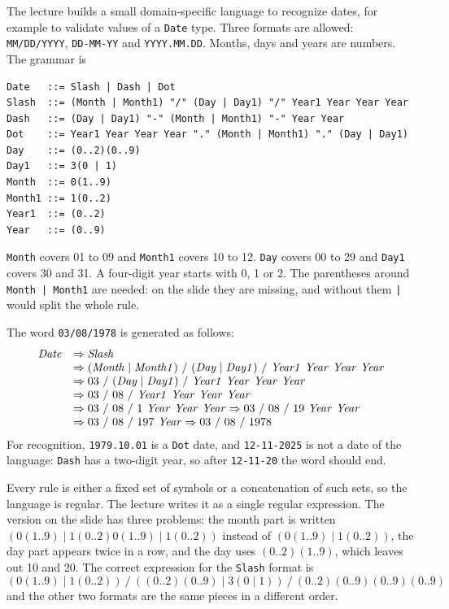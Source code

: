 The lecture builds a small domain-specific language to recognize dates, for
example to validate values of a \texttt{Date} type. Three formats are allowed:
\texttt{MM/DD/YYYY}, \texttt{DD-MM-YY} and \texttt{YYYY.MM.DD}. Months, days and
years are numbers. The grammar is
\begin{lstlisting}
Date   ::= Slash | Dash | Dot
Slash  ::= (Month | Month1) "/" (Day | Day1) "/" Year1 Year Year Year
Dash   ::= (Day | Day1) "-" (Month | Month1) "-" Year Year
Dot    ::= Year1 Year Year Year "." (Month | Month1) "." (Day | Day1)
Day    ::= (0..2)(0..9)
Day1   ::= 3(0 | 1)
Month  ::= 0(1..9)
Month1 ::= 1(0..2)
Year1  ::= (0..2)
Year   ::= (0..9)
\end{lstlisting}
\texttt{Month} covers 01 to 09 and \texttt{Month1} covers 10 to 12. \texttt{Day}
covers 00 to 29 and \texttt{Day1} covers 30 and 31. A four-digit year starts
with 0, 1 or 2. The parentheses around \texttt{Month | Month1} are needed: on the
slide they are missing, and without them \texttt{|} would split the whole rule.

The word \texttt{03/08/1978} is generated as follows:
\[
\begin{array}{l l}
\mathit{Date} & \Rightarrow \mathit{Slash} \\
& \Rightarrow (\mathit{Month} \mid \mathit{Month1})\ /\ (\mathit{Day} \mid \mathit{Day1})\ /\ \mathit{Year1}\ \mathit{Year}\ \mathit{Year}\ \mathit{Year} \\
& \Rightarrow 03\ /\ (\mathit{Day} \mid \mathit{Day1})\ /\ \mathit{Year1}\ \mathit{Year}\ \mathit{Year}\ \mathit{Year} \\
& \Rightarrow 03\ /\ 08\ /\ \mathit{Year1}\ \mathit{Year}\ \mathit{Year}\ \mathit{Year} \\
& \Rightarrow 03\ /\ 08\ /\ 1\ \mathit{Year}\ \mathit{Year}\ \mathit{Year}
  \Rightarrow 03\ /\ 08\ /\ 19\ \mathit{Year}\ \mathit{Year} \\
& \Rightarrow 03\ /\ 08\ /\ 197\ \mathit{Year}
  \Rightarrow 03\ /\ 08\ /\ 1978
\end{array}
\]
For recognition, \texttt{1979.10.01} is a \texttt{Dot} date, and \texttt{12-11-2025} is not a
date of the language: \texttt{Dash} has a two-digit year, so after
\texttt{12-11-20} the word should end.

Every rule is either a fixed set of symbols or a concatenation of such sets,
so the language is regular. The lecture writes it as a single regular
expression. The version on the slide has three problems: the month part is
written $(0(1..9) \mid 1(0..2)0(1..9) \mid 1(0..2))$ instead of
$(0(1..9) \mid 1(0..2))$, the day part appears twice in a row, and the day uses
$(0..2)(1..9)$, which leaves out 10 and 20. The correct expression for the
\texttt{Slash} format is
\[
(0(1..9) \mid 1(0..2))\ /\ ((0..2)(0..9) \mid 3(0 \mid 1))\ /\ (0..2)(0..9)(0..9)(0..9)
\]
and the other two formats are the same pieces in a different order.

